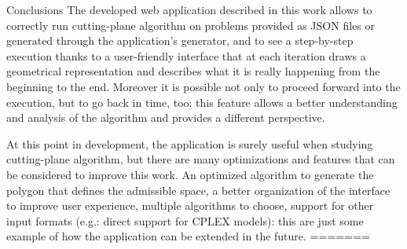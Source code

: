 \documentclass[9pt]{extarticle}
\begin{document}
    \begin{section}{Conclusions}
        The developed web application described in this work allows to correctly run cutting-plane algorithm on problems provided as JSON files 
        or generated through the application's generator, and to see a step-by-step execution thanks to a user-friendly interface that at each 
        iteration draws a geometrical representation and describes what it is really happening from the beginning to the end. 
        Moreover it is possible not only to proceed forward into the execution, but to go back in time, too: this feature allows a better 
        understanding and analysis of the algorithm and provides a different perspective.

        At this point in development, the application is surely useful when studying cutting-plane algorithm, but there are many optimizations
        and features that can be considered to improve this work. 
        An optimized algorithm to generate the polygon that defines the admissible space, a better organization of the interface to improve 
        user experience, multiple algorithms to choose, support for other input formats (e.g.: direct support for CPLEX models): this are just 
        some example of how the application can be extended in the future.
=======

    \end{section}
\end{document}

